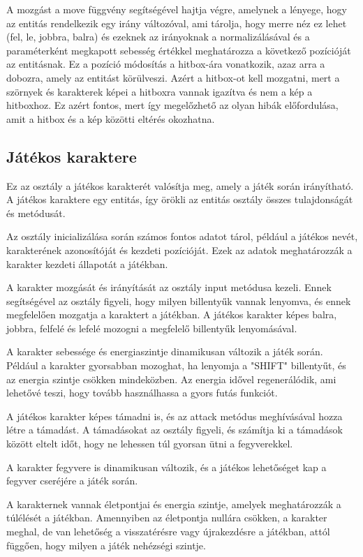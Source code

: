 A mozgást a move függvény segítségével hajtja végre, amelynek a lényege, hogy az entitás rendelkezik egy irány változóval, ami tárolja, hogy merre néz ez lehet (fel, le, jobbra, balra) és ezeknek az irányoknak a normalizálásával és a paraméterként megkapott sebesség értékkel meghatározza a következő pozícióját az entitásnak. Ez a pozíció módosítás a hitbox-ára vonatkozik, azaz arra a dobozra, amely az entitást körülveszi. Azért a hitbox-ot kell mozgatni, mert a szörnyek és karakterek képei a hitboxra vannak igazítva és nem a kép a hitboxhoz. Ez azért fontos, mert így megelőzhető az olyan hibák előfordulása, amit a hitbox és a kép közötti eltérés okozhatna.

                    
\subsection{Játékos karaktere}
\indent \indent Ez az osztály a játékos karakterét valósítja meg, amely a játék során irányítható. A játékos karaktere egy entitás, így örökli az entitás osztály összes tulajdonságát és metódusát.

Az osztály inicializálása során számos fontos adatot tárol, például a játékos nevét, karakterének azonosítóját és kezdeti pozícióját. Ezek az adatok meghatározzák a karakter kezdeti állapotát a játékban.

A karakter mozgását és irányítását az osztály input metódusa kezeli. Ennek segítségével az osztály figyeli, hogy milyen billentyűk vannak lenyomva, és ennek megfelelően mozgatja a karaktert a játékban. A játékos karakter képes balra, jobbra, felfelé és lefelé mozogni a megfelelő billentyűk lenyomásával.

A karakter sebessége és energiaszintje dinamikusan változik a játék során. Például a karakter gyorsabban mozoghat, ha lenyomja a "SHIFT" billentyűt, és az energia szintje csökken mindeközben. Az energia idővel regenerálódik, ami lehetővé teszi, hogy tovább használhassa a gyors futás funkciót.

A játékos karakter képes támadni is, és az attack metódus meghívásával hozza létre a támadást. A támadásokat az osztály figyeli, és számítja ki a támadások között eltelt időt, hogy ne lehessen túl gyorsan ütni a fegyverekkel.

A karakter fegyvere is dinamikusan változik, és a játékos lehetőséget kap a fegyver cseréjére a játék során.

A karakternek vannak életpontjai és energia szintje, amelyek meghatározzák a túlélését a játékban. Amennyiben az életpontja nullára csökken, a karakter meghal, de van lehetőség a visszatérésre vagy újrakezdésre a játékban, attól függően, hogy milyen a játék nehézségi szintje.

